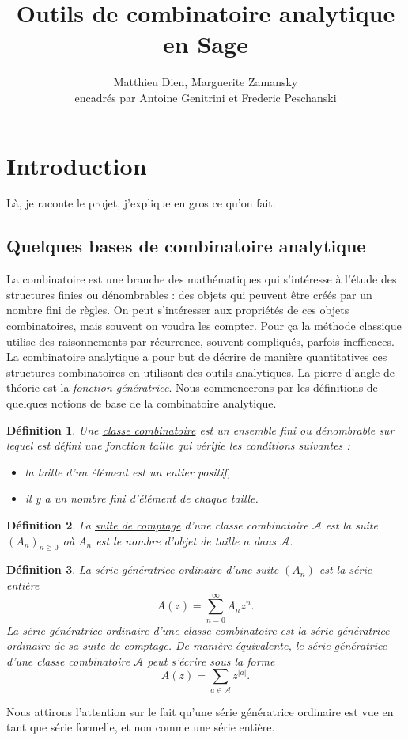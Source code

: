 \documentclass[12pt]{article}
\title{Outils de combinatoire analytique en Sage}
\author{Matthieu Dien, Marguerite Zamansky\\
encadrés par Antoine Genitrini et Frederic Peschanski }
\newtheorem*{definition}{Définition}
\begin{document}
     
\maketitle
     
\section{Introduction}
Là, je raconte le projet, j'explique en gros ce qu'on fait.

\subsection{Quelques bases de combinatoire analytique}
La combinatoire est une branche des mathématiques qui s'intéresse à l'étude des structures finies ou dénombrables : des objets qui peuvent être créés par un nombre fini de règles. On peut s'intéresser aux propriétés de ces objets combinatoires, mais souvent on voudra les compter. Pour ça la méthode classique utilise des raisonnements par récurrence, souvent compliqués, parfois inefficaces.
La combinatoire analytique a pour but de décrire de manière quantitatives ces structures combinatoires en utilisant des outils analytiques. La pierre d'angle de théorie est la \textit{fonction génératrice}. Nous commencerons par les définitions de quelques notions de base de la combinatoire analytique.

\begin{definition}
  Une \underline{classe combinatoire} est un ensemble fini ou dénombrable sur lequel est défini une fonction taille qui vérifie les conditions suivantes : 
  \begin{itemize}
    \item la taille d'un élément est un entier positif,
    \item il y a un nombre fini d'élément de chaque taille.
  \end{itemize}
\end{definition}

\begin{definition}
La \underline{suite de comptage} d'une classe combinatoire $\mathcal A$ est la suite $(A_n)_{n \geqslant 0}$ où $A_n$ est le nombre d'objet de taille $n$ dans $\mathcal A$.
\end{definition}


\begin{definition}
  La \underline{série génératrice ordinaire} d'une suite $(A_n)$ est la série entière
  $$A(z) = \sum_{n=0}^{\infty} A_n z^n .$$
  La série génératrice ordinaire d'une classe combinatoire est la série génératrice ordinaire de sa suite de comptage. De manière équivalente, le série génératrice d'une classe combinatoire $\mathcal A$ peut s'écrire sous la forme 
  $$A(z) = \sum_{a \in \mathcal A} z ^{|a|} .$$
\end{definition}
Nous attirons l'attention sur le fait qu'une série génératrice ordinaire est vue en tant que série formelle, et non comme une série entière.
\end{document}

